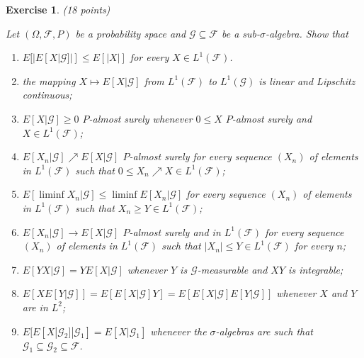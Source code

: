 \documentclass[DIV=classic,a4paper,10pt]{scrartcl}
\newtheorem{exercise}[theorem]{Exercise}
\theoremstyle{nonumberplain}
\numberwithin{equation}{section}
\begin{document}
\begin{exercise}(18 points)

    Let $(\Omega,\mathcal{F},P)$ be a probability space and $\mathcal{G}\subseteq \mathcal{F}$ be a sub-$\sigma$-algebra.
    Show that
    \begin{enumerate}[label=\textit{(\roman*)}]
        \item $E[|E[X|\mathcal{G}]|]\leq E[|X|]$ for every $X \in L^1(\mathcal{F})$.
        \item the mapping $X\mapsto E[X | \mathcal{G}]$ from $L^1(\mathcal{F})$ to $L^1(\mathcal{G})$ is linear and Lipschitz continuous;
        \item $E[X|\mathcal{G}]\geq 0$ $P$-almost surely whenever $0\leq X$ $P$-almost surely and $X \in L^1(\mathcal{F})$;
        \item $E[X_n|\mathcal{G}]\nearrow E[X|\mathcal{G}]$ $P$-almost surely for every sequence $(X_n)$ of elements in $L^1(\mathcal{F})$ such that $0\leq X_n\nearrow X\in L^1(\mathcal{F})$;
        \item $E[\liminf X_n |\mathcal{G}]\leq \liminf E[X_n|\mathcal{G}]$ for every sequence $(X_n)$ of elements in $L^1(\mathcal{F})$ such that $X_n\geq Y \in L^1(\mathcal{F})$;
        \item $E[X_n|\mathcal{G}]\to E[X|\mathcal{G}]$ $P$-almost surely and in $L^1(\mathcal{F})$ for every sequence $(X_n)$ of elements in $L^1(\mathcal{F})$ such that $|X_n|\leq Y\in L^1(\mathcal{F})$ for every $n$;
        \item $E[YX|\mathcal{G}]=YE[X|\mathcal{G}]$ whenever $Y$ is $\mathcal{G}$-measurable and $XY$ is integrable;
        \item $E[XE[Y|\mathcal{G}]]=E[E[X|\mathcal{G}]Y]=E[E[X|\mathcal{G}]E[Y|\mathcal{G}]]$ whenever $X$ and $Y$ are in $L^2$;
        \item $E[E[X|\mathcal{G}_2]|\mathcal{G}_1]=E[X|\mathcal{G}_1]$ whenever the $\sigma$-algebras are such that $\mathcal{G}_1\subseteq \mathcal{G}_2\subseteq \mathcal{F}$.
    \end{enumerate}
\end{exercise}
\end{document}
